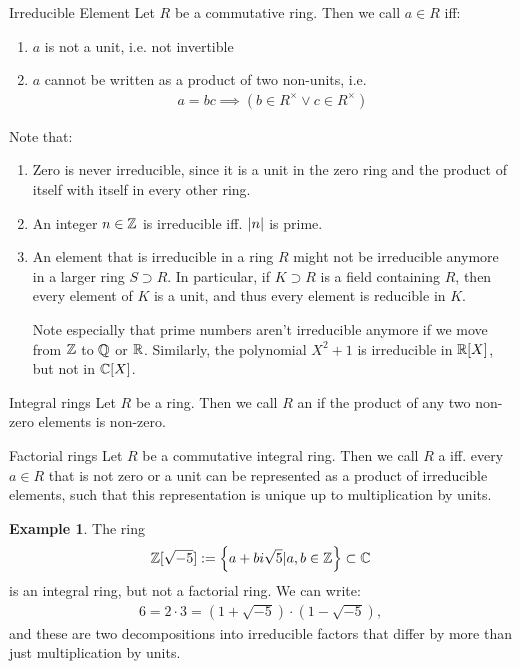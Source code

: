 \documentclass[10pt]{report}
\theoremstyle{definition}
\newtheorem{example}[lemma]{Example}
\begin{document}
	\begin{importantdefinition}{Irreducible Element}{}
		Let $R$ be a commutative ring. Then we call $a \in R$  iff:
		\begin{enumerate}
			\item $a$ is not a unit, i.e. not invertible
			\item $a$ cannot be written as a product of two non-units, i.e.
			\begin{align*}
				a = bc \implies (b \in R^\times \vee c \in R^\times)
			\end{align*}
		\end{enumerate}
	\end{importantdefinition}
	Note that:
	\begin{enumerate}
		\item Zero is never irreducible, since it is a unit in the zero ring and the product of itself with itself in every other ring.
		\item An integer $n \in \mathbb{Z}$ is irreducible iff. $\abs{n}$ is prime.
		\item An element that is irreducible in a ring $R$ might not be irreducible anymore in a larger ring $S \supset R$. In particular, if $K \supset R$ is a field containing $R$, then every element of $K$ is a unit, and thus every element is reducible in $K$. 
		
		Note especially that prime numbers aren't irreducible anymore if we move from $\mathbb{Z}$ to $\mathbb{Q}$ or $\mathbb{R}$. Similarly, the polynomial $X^2 + 1$ is irreducible in $\mathbb{R}[X]$, but not in $\mathbb{C}[X]$.
	\end{enumerate}
	\begin{importantdefinition}{Integral rings}{}
		Let $R$ be a ring. Then we call $R$ an  if the product of any two non-zero elements is non-zero.
	\end{importantdefinition}
	\begin{importantdefinition}{Factorial rings}{}
		Let $R$ be a commutative integral ring. Then we call $R$ a  iff. every $a \in R$ that is not zero or a unit can be represented as a product of irreducible elements, such that this representation is unique up to multiplication by units.
	\end{importantdefinition}
	\begin{example}
		The ring
		\begin{align*}
			\mathbb{Z}[\sqrt{-5}] := \qty{a + bi\sqrt{5} | a,b \in \mathbb{Z}} \subset \mathbb{C}
		\end{align*}
		is an integral ring, but not a factorial ring. We can write:
		\begin{align*}
			6 = 2 \cdot 3 = (1 + \sqrt{-5}) \cdot (1 - \sqrt{-5}),
		\end{align*}
		and these are two decompositions into irreducible factors that differ by more than just multiplication by units.
	\end{example}
\end{document}
